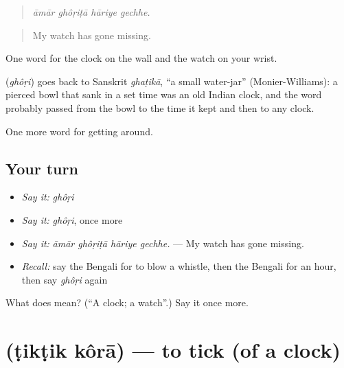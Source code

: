 \begin{quote}
   
\end{quote}

\begin{quote}
\emph{āmār ghôṛiṭā hāriye gechhe.}
\end{quote}

\begin{quote}
My watch has gone missing.
\end{quote}

One word for the clock on the wall and the watch on your wrist.

\begin{cousinweb}
\textbf{} (\emph{ghôṛi}) goes back to Sanskrit \emph{ghaṭikā}, \textquotedblleft{}a small water-jar\textquotedblright{} (Monier-Williams): a pierced bowl that sank in a set time was an old Indian clock, and the word probably passed from the bowl to the time it kept and then to any clock.
\end{cousinweb}

\begin{grammarlens}[title={What you've built}]
One more word for getting around.
\end{grammarlens}

\subsection*{Your turn}
\begin{itemize}
\raggedright
  \item \emph{Say it:} \emph{ghôṛi}
  \item \emph{Say it:} \emph{ghôṛi}, once more
  \item \emph{Say it:} \emph{āmār ghôṛiṭā hāriye gechhe.} — My watch has gone missing.
  \item \emph{Recall:} say the Bengali for to blow a whistle, then the Bengali for an hour, then say \emph{ghôṛi} again
\end{itemize}

\begin{tcolorbox}[breakable,colback=teal!4,colframe=teal!35!black,title={Before you move on}]
What does  mean? (\textquotedblleft{}A clock; a watch\textquotedblright{}.) Say it once more.
\end{tcolorbox}
\section[\texorpdfstring{\bn{টিকটিক} \bn{করা} (ṭikṭik kôrā)}{টিকটিক করা (ṭikṭik kôrā)}]{  (ṭikṭik kôrā) — to tick (of a clock)}

